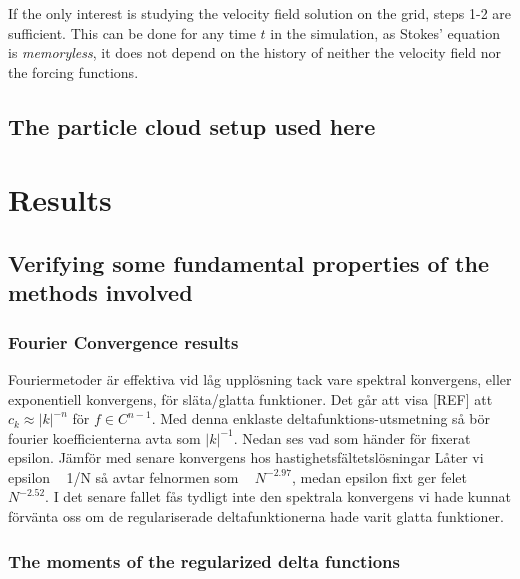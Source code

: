 \documentclass[a4paper,twoside=false,abstract=false,numbers=noenddot,
titlepage=false,headings=small,parskip=half,version=last]{scrartcl}
\begin{document}
If the only interest is studying the velocity field solution on the grid, steps 1-2 are sufficient. This can be done for any time $t$ in the simulation, as Stokes' equation is \emph{memoryless}, it does not depend on the history of neither the velocity field nor the forcing functions.

\subsection{The particle cloud setup used here}

\section{Results}

\subsection{Verifying some fundamental properties of the methods involved}
\subsubsection{Fourier Convergence results}
Fouriermetoder är effektiva vid låg upplösning tack vare spektral konvergens, eller exponentiell konvergens, för släta/glatta funktioner. Det går att visa [REF] att $c_k \approx |k|^{-n}$ för $f \in C^{n-1}$.
Med denna enklaste deltafunktions-utsmetning så bör fourier koefficienterna avta som $|k|^{-1}$.
Nedan ses vad som händer för fixerat epsilon. Jämför med senare 
konvergens hos hastighetsfältetslösningar
Låter vi epsilon ~ 1/N så avtar felnormen som ~ $N^{-2.97}$, medan epsilon fixt ger felet ~ $N^{-2.52}$. I det senare fallet fås tydligt inte den spektrala konvergens vi hade kunnat förvänta oss om de regulariserade deltafunktionerna hade varit glatta funktioner.
\subsubsection{The moments of the regularized delta functions}
\subsubsection{}
\end{document}
